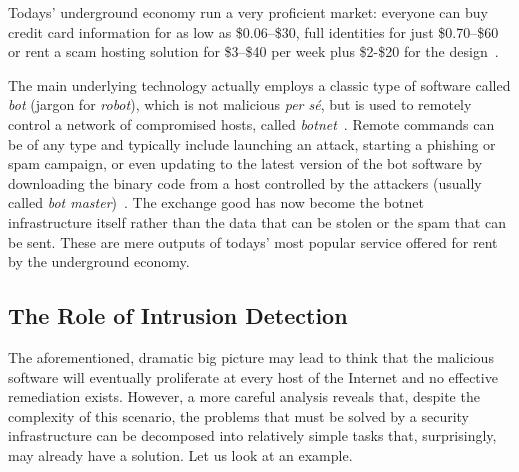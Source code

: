 Todays' underground economy run a very proficient market: everyone can
buy credit card information for as low as \$0.06--\$30, full
identities for just \$0.70--\$60 or rent a scam hosting solution for
\$3--\$40 per week plus \$2-\$20 for the
design~\citep{symantec_threat_report_2009}.

The main underlying technology actually employs a classic type of
software called \emph{bot} (jargon for \emph{robot}), which is not
malicious \emph{per s\'e}, but is used to remotely control a network
of compromised hosts, called \emph{botnet}~\citep{holz}. Remote
commands can be of any type and typically include launching an attack,
starting a phishing or spam campaign, or even updating to the latest
version of the bot software by downloading the binary code from a host
controlled by the attackers (usually called \emph{bot
master})~\citep{torpig}. The exchange good has now become the botnet
infrastructure itself rather than the data that can be stolen or the
spam that can be sent. These are mere outputs of todays' most popular
service offered for rent by the underground economy.

\subsection{The Role of Intrusion Detection}
\label{introduction:motivation:ids-role}
The aforementioned, dramatic big picture may lead to think that the
malicious software will eventually proliferate at every host of the
Internet and no effective remediation exists. However, a more careful
analysis reveals that, despite the complexity of this scenario, the
problems that must be solved by a security infrastructure can be
decomposed into relatively simple tasks that, surprisingly, may
already have a solution. Let us look at an example.

